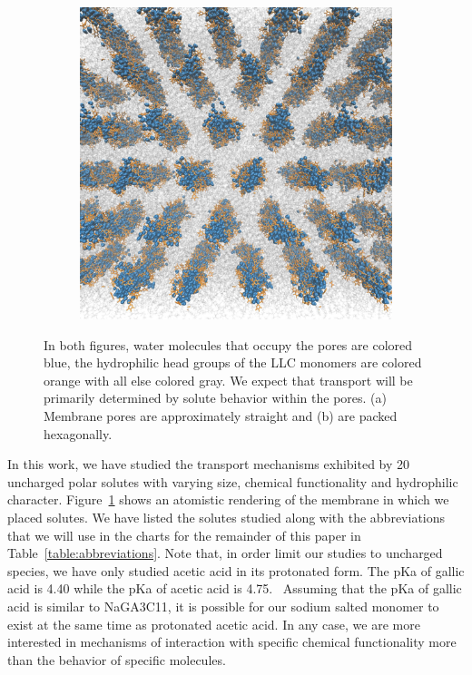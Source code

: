 \documentclass[journal=jpcbfk,manuscript=article]{achemso}
\begin{document}
\begin{figure}
\begin{subfigure}{0.45\textwidth}
  \includegraphics[width=\textwidth]{top_view.pdf}
  \caption{}
  \end{subfigure}
  \caption{In both figures, water molecules that occupy the pores are colored blue,
  the hydrophilic head groups of the LLC monomers are colored orange with all else
  colored gray. 
  We expect that transport will be primarily determined by solute
  behavior within the pores. 
  (a) Membrane pores are approximately straight and (b)
  are packed hexagonally.}\label{fig:membrane_rendering}
  \end{figure}

  In this work, we have studied the transport mechanisms exhibited by 20 
  uncharged polar solutes with varying size, chemical functionality and hydrophilic 
  character. Figure~\ref{fig:membrane_rendering} shows an atomistic rendering of
  the membrane in which we placed solutes. We have listed the solutes studied along with the abbreviations that
  we will use in the charts for the remainder of this paper in Table~\ref{table:abbreviations}.
  Note that, in order limit our studies to uncharged species, we have only studied
  acetic acid in its protonated form. The pKa of gallic acid is 4.40 while the
  pKa of acetic acid is 4.75.~\cite{chuysinuan_gallic_2009,perrin_pka_1981} 
  Assuming that the pKa of gallic acid is similar to NaGA3C11, it is possible
  for our sodium salted monomer to exist at the same time as protonated acetic
  acid. In any case, we are more interested in mechanisms of interaction with
  specific chemical functionality more than the behavior of specific molecules.
\end{document}
